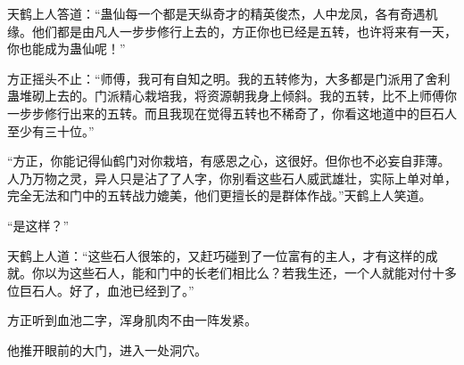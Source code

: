 \begin{this_body}
天鹤上人答道：“蛊仙每一个都是天纵奇才的精英俊杰，人中龙凤，各有奇遇机缘。他们都是由凡人一步步修行上去的，方正你也已经是五转，也许将来有一天，你也能成为蛊仙呢！”

方正摇头不止：“师傅，我可有自知之明。我的五转修为，大多都是门派用了舍利蛊堆砌上去的。门派精心栽培我，将资源朝我身上倾斜。我的五转，比不上师傅你一步步修行出来的五转。而且我现在觉得五转也不稀奇了，你看这地道中的巨石人至少有三十位。”

“方正，你能记得仙鹤门对你栽培，有感恩之心，这很好。但你也不必妄自菲薄。人乃万物之灵，异人只是沾了了人字，你别看这些石人威武雄壮，实际上单对单，完全无法和门中的五转战力媲美，他们更擅长的是群体作战。”天鹤上人笑道。

“是这样？”

天鹤上人道：“这些石人很笨的，又赶巧碰到了一位富有的主人，才有这样的成就。你以为这些石人，能和门中的长老们相比么？若我生还，一个人就能对付十多位巨石人。好了，血池已经到了。”

方正听到血池二字，浑身肌肉不由一阵发紧。

他推开眼前的大门，进入一处洞穴。

\end{this_body}

